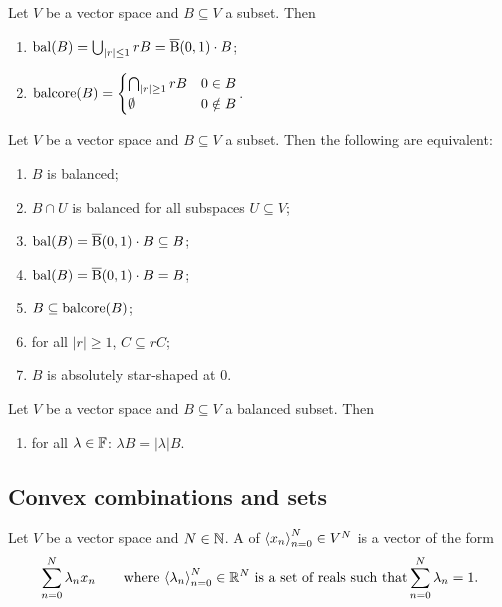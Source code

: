 \begin{lemma}
Let $V$ be a vector space and $B\subseteq V$ a subset. Then
\begin{enumerate}
\item $\operatorname{bal}(B) = \bigcup_{|r|\leq 1}rB = \operatorname{\overline{B}}(0,1)\cdot B$;
\item $\operatorname{balcore}(B) = \begin{cases}
\bigcap_{|r|\geq 1}rB & 0\in B\\
\emptyset & 0\notin B
\end{cases}$.
\end{enumerate}
\end{lemma}

\begin{lemma}
Let $V$ be a vector space and $B\subseteq V$ a subset. Then the following are equivalent:
\begin{enumerate}
\item $B$ is balanced;
\item $B\cap U$ is balanced for all subspaces $U\subseteq V$;
\item $\operatorname{bal}(B) = \operatorname{\overline{B}}(0,1)\cdot B \subseteq B$;
\item $\operatorname{bal}(B) = \operatorname{\overline{B}}(0,1)\cdot B = B$;
\item $B\subseteq \operatorname{balcore}(B)$;
\item for all $|r|\geq 1$, $C\subseteq rC$;
\item $B$ is absolutely star-shaped at $0$.
\end{enumerate}
\end{lemma}

\begin{lemma} \label{balancedLemma}
Let $V$ be a vector space and $B\subseteq V$ a balanced subset. Then
\begin{enumerate}
\item for all $\lambda\in \mathbb{F}$: $\lambda B = |\lambda| B$.
\end{enumerate}
\end{lemma}



\subsection{Convex combinations and sets}
\begin{definition}
Let $V$ be a vector space and $N\in \mathbb{N}$. A  of $\left\langle x_n \right\rangle_{n=0}^N \in V^N$ is a vector of the form
\[ \sum_{n=0}^N \lambda_n x_n \qquad \text{where $\left\langle \lambda_n \right\rangle_{n=0}^N \in \mathbb{R}^N$ is a set of reals such that} \sum_{n=0}^N \lambda_n = 1. \]
\end{definition}

